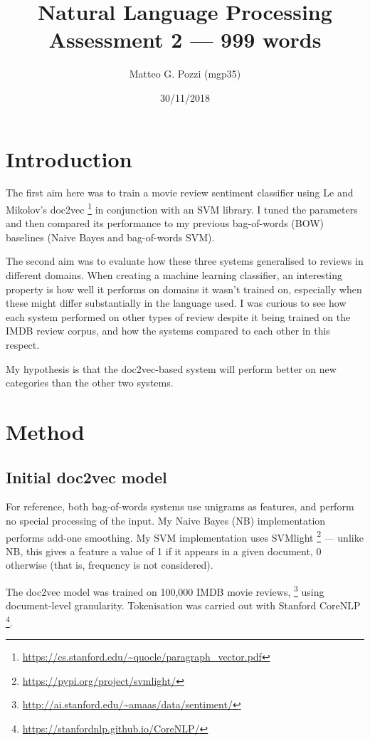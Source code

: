 \documentclass[12pt,a4paper,twoside,twocolumn]{article}
\title{%
  Natural Language Processing \\
  \large Assessment 2 --- 999 words}
\author{Matteo G. Pozzi (mgp35)\vspace{-2ex}}
\date{30/11/2018\vspace{3ex}}
\begin{document}
\maketitle


\section{Introduction}

The first aim here was to train a movie review sentiment classifier using Le and Mikolov's doc2vec \footnote{\url{https://cs.stanford.edu/~quocle/paragraph_vector.pdf}} in conjunction with an SVM library. I tuned the parameters and then compared its performance to my previous bag-of-words (BOW) baselines (Naive Bayes and bag-of-words SVM).

The second aim was to evaluate how these three systems generalised to reviews in different domains. When creating a machine learning classifier, an interesting property is how well it performs on domains it wasn't trained on, especially when these might differ substantially in the language used. I was curious to see how each system performed on other types of review despite it being trained on the IMDB review corpus, and how the systems compared to each other in this respect.

My hypothesis is that the doc2vec-based system will perform better on new categories than the other two systems.

\section{Method}

\subsection{Initial doc2vec model}

For reference, both bag-of-words systems use unigrams as features, and perform no special processing of the input. My Naive Bayes (NB) implementation performs add-one smoothing. My SVM implementation uses SVMlight \footnote{\url{https://pypi.org/project/svmlight/}} --- unlike NB, this gives a feature a value of 1 if it appears in a given document, 0 otherwise (that is, frequency is not considered).

The doc2vec model was trained on 100,000 IMDB movie reviews, \footnote{\url{http://ai.stanford.edu/~amaas/data/sentiment/}} using document-level granularity. Tokenisation was carried out with Stanford CoreNLP \footnote{\url{https://stanfordnlp.github.io/CoreNLP/}}.
\end{document}
